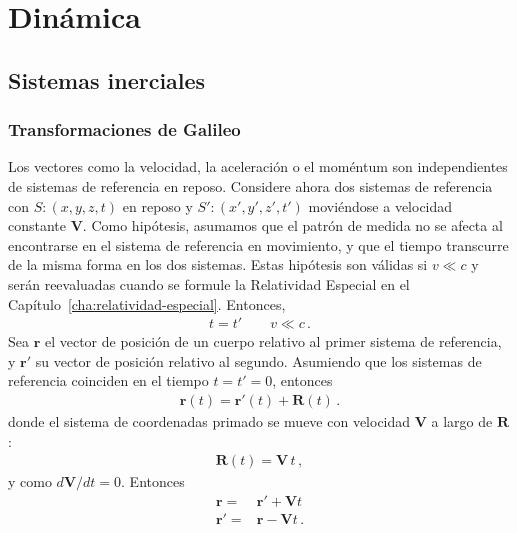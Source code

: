 \chapter{Din\'amica}
\label{cha:dinamica}

\section{Sistemas inerciales}

\subsection{Transformaciones de Galileo}

Los vectores como la velocidad, la aceleración o el moméntum
son independientes de sistemas de referencia en
reposo. 
Considere ahora dos sistemas de referencia con $S:(x,y,z,t)$ en reposo
y $S':(x',y',z',t')$ moviéndose a velocidad constante
$\mathbf{V}$. 
Como hipótesis, asumamos que el patrón de medida no se afecta al
encontrarse en el sistema de referencia en movimiento, y que el tiempo
transcurre de la misma forma en los dos sistemas. 
Estas hipótesis son válidas si $v\ll c$ y serán reevaluadas cuando se
formule la Relatividad Especial en el
Capítulo~\ref{cha:relatividad-especial}. 
Entonces,
\begin{align}
  t=t'\qquad v\ll c\,.
\end{align}
Sea $\mathbf{r}$ el vector de posición de un cuerpo relativo al
primer sistema de referencia, y $\mathbf{r}'$ su vector de posición
relativo al segundo.
Asumiendo que los sistemas de referencia coinciden en el tiempo
$t=t'=0$, entonces
\begin{align}
  \mathbf{r}(t)=\mathbf{r}'(t)+\mathbf{R}(t)\,.
\end{align}
donde el sistema de coordenadas primado se mueve con velocidad
$\mathbf{V}$ a largo de $\mathbf{R}$:
\begin{align}
  \mathbf{R}(t)=\mathbf{V}\, t\,,
\end{align}
y como $d\mathbf{V}/dt=0$. Entonces
\begin{align}
\label{eq:rp}
  \mathbf{r}=&\mathbf{r}'+\mathbf{V}t\nonumber\\
  \mathbf{r}'=&\mathbf{r}-\mathbf{V}t\,.
\end{align}

